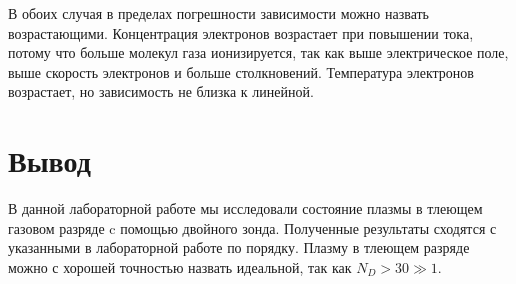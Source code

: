 \documentclass[a4paper, 12pt]{article}
\begin{document}
	\newpage
	В обоих случая в пределах погрешности зависимости можно назвать возрастающими. Концентрация электронов возрастает при повышении тока, потому что больше молекул газа ионизируется, так как выше электрическое поле, выше скорость электронов и больше столкновений. Температура электронов возрастает, но зависимость не близка к линейной.
	
	\section*{Вывод}
	В данной лабораторной работе мы исследовали состояние плазмы в тлеющем газовом разряде c помощью двойного зонда. Полученные результаты сходятся с указанными в лабораторной работе по порядку. Плазму в тлеющем разряде можно с хорошей точностью назвать идеальной, так как $N_D > 30 \gg 1$.
\end{document}
